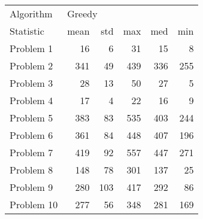 \begin{tabular}{lrrrrr}
\toprule
Algorithm & \multicolumn{5}{l}{Greedy} \\
Statistic &   mean &  std &  max &  med &  min \\
\midrule
Problem 1  &     16 &    6 &   31 &   15 &    8 \\
Problem 2  &    341 &   49 &  439 &  336 &  255 \\
Problem 3  &     28 &   13 &   50 &   27 &    5 \\
Problem 4  &     17 &    4 &   22 &   16 &    9 \\
Problem 5  &    383 &   83 &  535 &  403 &  244 \\
Problem 6  &    361 &   84 &  448 &  407 &  196 \\
Problem 7  &    419 &   92 &  557 &  447 &  271 \\
Problem 8  &    148 &   78 &  301 &  137 &   25 \\
Problem 9  &    280 &  103 &  417 &  292 &   86 \\
Problem 10 &    277 &   56 &  348 &  281 &  169 \\
\bottomrule
\end{tabular}
